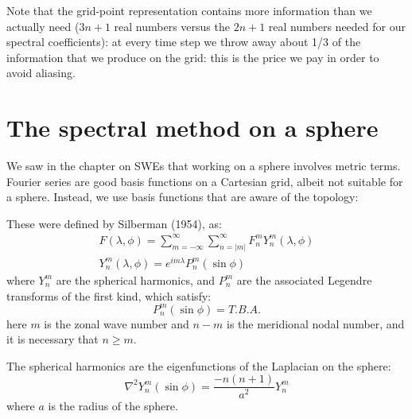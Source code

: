 
Note that the grid-point representation contains more information than we actually need ($3n+1$ real numbers versus the $2n+1$ real numbers needed for our spectral coefficients): at every time step we throw away about 1/3 of the information that we produce on the grid: this is the price we pay in order to avoid aliasing.

\section{The spectral method on a sphere}
We saw in the chapter on SWEs that working on a sphere involves metric terms. Fourier series are good basis functions on a Cartesian grid, albeit not suitable for a sphere. Instead, we use basis functions that are aware of the topology:

\begin{definition}
	These were defined by Silberman (1954), as:
	\begin{eqnarray}
		F(\lambda, \phi)= \sum_{m=-\infty}^{\infty} \sum_{n=|m|}^{\infty} F_n^m Y_n^m (\lambda, \phi)\\
		Y_n^m (\lambda, \phi) = e^{im \lambda} P_n^m (\sin \phi)
	\end{eqnarray}
	where $Y_n^m$ are the spherical harmonics, and  $P_n^m$ are the associated Legendre transforms of the first kind, which satisfy:
	\begin{equation}
		P_n^m (\sin \phi) = T.B.A.
		\end{equation}
	here $m$ is the zonal wave number and $n-m$ is the meridional nodal number, and it is necessary that $n \ge m$.
\end{definition}

The spherical harmonics are the eigenfunctions of the Laplacian on the sphere:
	\begin{equation}
	\nabla^2 Y_n^m (\sin \phi) = \frac{-n(n+1)}{a^2} Y_n^m
\end{equation}
where $a$ is the radius of the sphere.
